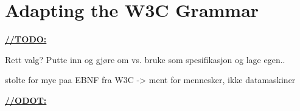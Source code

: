 \section{Adapting the W3C Grammar}


\underline{\textbf{\LARGE //TODO:}}

Rett valg? Putte inn og gj\o re om vs. bruke som spesifikasjon og lage egen..

stolte for mye paa EBNF fra W3C -> ment for mennesker, ikke datamaskiner

\underline{\textbf{\LARGE //ODOT:}}